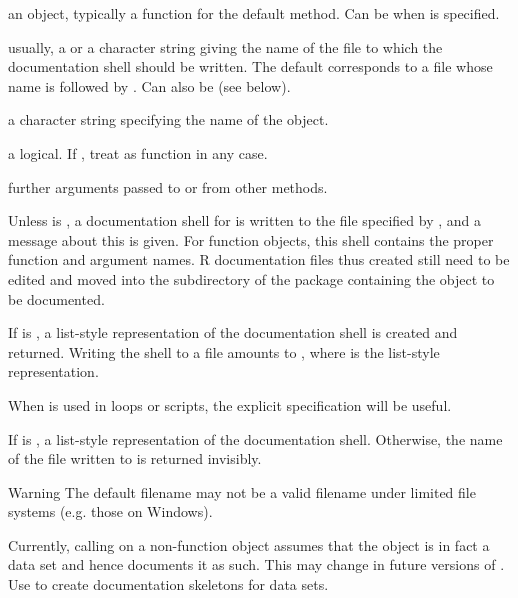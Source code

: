 %
\begin{Arguments}
\begin{ldescription}
\item[\code{object}] an \R{} object, typically a function for the default
method.  Can be  when  is specified.
\item[\code{filename}] usually, a  or a character string giving the
name of the file to which the documentation shell should be written.
The default corresponds to a file whose name is  followed
by .  Can also be  (see below).
\item[\code{name}] a character string specifying the name of the object.
\item[\code{force.function}] a logical.  If , treat 
as function in any case.
\item[\code{...}] further arguments passed to or from other methods.
\end{ldescription}
\end{Arguments}
%
\begin{Details}\relax
Unless  is , a documentation shell for
 is written to the file specified by , and
a message about this is given.  For function objects, this shell
contains the proper function and argument names.  R documentation
files thus created still need to be edited and moved into the
 subdirectory of the package containing the object to be
documented.

If  is , a list-style representation of the
documentation shell is created and returned.  Writing the shell to a
file amounts to ,
where  is the list-style representation.

When  is used in  loops or scripts, the
explicit  specification will be useful.
\end{Details}
%
\begin{Value}
If  is , a list-style representation of the
documentation shell.  Otherwise, the name of the file written to is
returned invisibly.
\end{Value}
%
\begin{Section}{Warning}
The default filename may not be a valid filename under limited file
systems (e.g. those on Windows).

Currently, calling  on a non-function object assumes that
the object is in fact a data set and hence documents it as such.  This
may change in future versions of \R{}.  Use  to
create documentation skeletons for data sets.
\end{Section}
